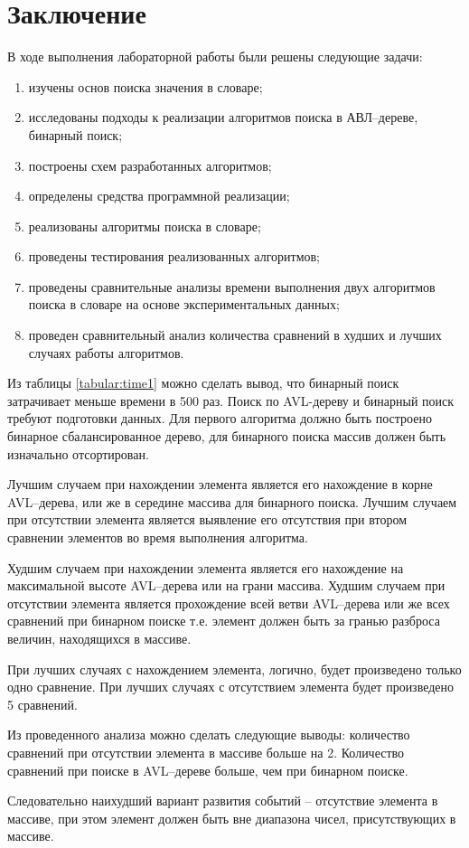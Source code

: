 \chapter*{Заключение}

В ходе выполнения лабораторной работы были решены следующие задачи:

\begin{enumerate}
	\item изучены основ поиска значения в словаре;
	\item исследованы подходы к реализации алгоритмов поиска в АВЛ--дереве, бинарный поиск;
	\item построены схем разработанных алгоритмов;
	\item определены средства программной реализации; 
	\item реализованы алгоритмы поиска в словаре;
	\item проведены тестирования реализованных алгоритмов;
	\item проведены сравнительные анализы времени выполнения двух алгоритмов поиска в словаре на основе экспериментальных данных;
	\item проведен сравнительный анализ количества сравнений в худших и лучших случаях работы алгоритмов.
\end{enumerate}

Из таблицы \ref{tabular:time1} можно сделать вывод, что бинарный поиск затрачивает меньше времени в 500 раз. 
Поиск по AVL-дереву и бинарный поиск требуют подготовки данных. 
Для первого алгоритма должно быть построено бинарное сбалансированное дерево, для бинарного поиска массив должен быть изначально отсортирован.


Лучшим случаем при нахождении элемента является его нахождение в корне AVL--дерева, или же в середине массива для бинарного поиска.
Лучшим случаем при отсутствии элемента является выявление его отсутствия при втором сравнении элементов во время выполнения алгоритма.


Худшим случаем при нахождении элемента является его нахождение на максимальной высоте AVL--дерева или на грани массива. 
Худшим случаем при отсутствии элемента является прохождение всей ветви AVL--дерева или же всех сравнений при бинарном поиске т.е. элемент должен быть за гранью разброса величин, находящихся в массиве.


При лучших случаях с нахождением элемента, логично, будет произведено только одно сравнение.
При лучших случаях с отсутствием элемента будет произведено 5 сравнений.


Из проведенного анализа можно сделать следующие выводы: количество сравнений при отсутствии элемента в массиве больше на 2. 
Количество сравнений при поиске в AVL--дереве больше, чем при бинарном поиске.


Следовательно наихудший вариант развития событий -- отсутствие элемента в массиве, при этом элемент должен быть вне диапазона чисел, присутствующих в массиве.